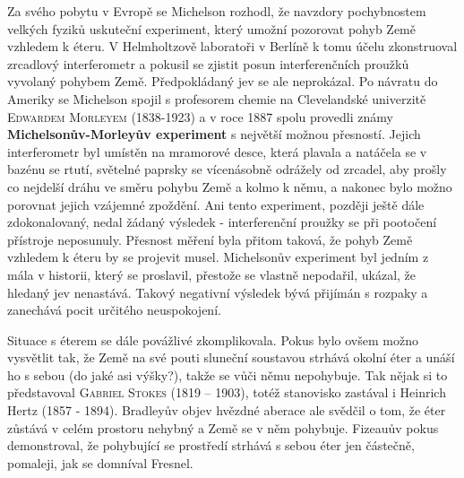       Za svého pobytu v Evropě se Michelson rozhodl, že navzdory pochybnostem velkých fyziků
      uskuteční experiment, který umožní pozorovat pohyb Země vzhledem k éteru. V Helmholtzově
      laboratoři v Berlíně k tomu účelu zkonstruoval zrcadlový interferometr a pokusil se zjistit
      posun interferenčních proužků vyvolaný pohybem Země. Předpokládaný jev se ale neprokázal. Po
      návratu do Ameriky se Michelson spojil s profesorem chemie na Clevelandské univerzitě
      \textsc{Edwardem Morleyem} (1838-1923) a v roce 1887 spolu provedli známy
      \textbf{Michelsonův-Morleyův experiment} s největší možnou přesností. Jejich interferometr byl
      umístěn na mramorové desce, která plavala a natáčela se v bazénu se rtutí, světelné paprsky se
      vícenásobně odrážely od zrcadel, aby prošly co nejdelší dráhu ve směru pohybu Země a kolmo k
      němu, a nakonec bylo možno porovnat jejich vzájemné zpoždění. Ani tento experiment, později
      ještě dále zdokonalovaný, nedal žádaný výsledek - interferenční proužky se při pootočení
      přístroje neposunuly. Přesnost měření byla přitom taková, že pohyb Země vzhledem k éteru by se
      projevit musel. Michelsonův experiment byl jedním z mála v historii, který se proslavil,
      přestože se vlastně nepodařil, ukázal, že hledaný jev nenastává. Takový negativní výsledek
      bývá přijímán s rozpaky a zanechává pocit určitého neuspokojení.

      Situace s éterem se dále povážlivé zkomplikovala. Pokus bylo ovšem možno vysvětlit tak, že
      Země na své pouti sluneční soustavou strhává okolní éter a unáší ho s sebou (do jaké asi
      výšky?), takže se vůči němu nepohybuje. Tak nějak si to představoval \textsc{Gabriel Stokes}
      (1819 – 1903), totéž stanovisko zastával i Heinrich Hertz (1857 - 1894). Bradleyův objev
      hvězdné aberace ale svědčil o tom, že éter zůstává v celém prostoru nehybný a Země se v něm
      pohybuje. Fizeauův pokus demonstroval, že pohybující se prostředí strhává s sebou éter jen
      částečně, pomaleji, jak se domníval Fresnel.


